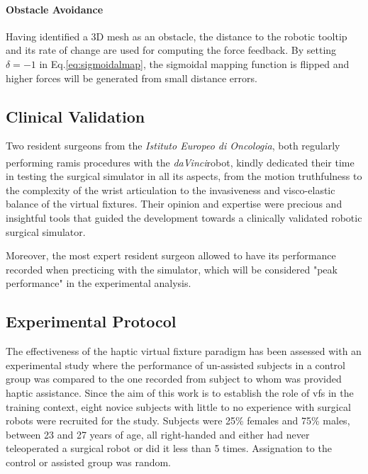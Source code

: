 \documentclass{article}
\newcommand{\cright}{\textsuperscript{\textregistered}\phantom{..}}
\begin{document}
\begin{multicols}{2}
\paragraph{Obstacle Avoidance} Having identified a 3D mesh as an obstacle, the distance to the robotic tooltip and its rate of change are used for computing the force feedback. By setting $\delta = -1$ in Eq.\ref{eq:sigmoidalmap}, the sigmoidal mapping function is flipped and higher forces will be generated from small distance errors. 

\subsection{Clinical Validation}
Two resident surgeons from the \textit{Istituto Europeo di Oncologia}, both regularly performing \ac{ramis} procedures with the \textit{daVinci}\cright robot, kindly dedicated their time in testing the surgical simulator in all its aspects, from the motion truthfulness to the complexity of the wrist articulation to the invasiveness and visco-elastic balance of the virtual fixtures. Their opinion and expertise were precious and insightful tools that guided the development towards a clinically validated robotic surgical simulator. 

Moreover, the most expert resident surgeon allowed to have its performance recorded when precticing with the simulator, which will be considered "peak performance" in the experimental analysis. 
\subsection{Experimental Protocol}
The effectiveness of the haptic virtual fixture paradigm has been assessed with an experimental study where the performance of un-assisted subjects in a control group was compared to the one recorded from subject to whom was provided haptic assistance. Since the aim of this work is to establish the role of \acp{vf} in the training context, eight novice subjects with little to no experience with surgical robots were recruited for the study. Subjects were 25\% females and 75\% males, between 23 and 27 years of age, all right-handed and either had never teleoperated a surgical robot or did it less than 5 times. Assignation to the control or assisted group was random.


\end{multicols}
\end{document}
